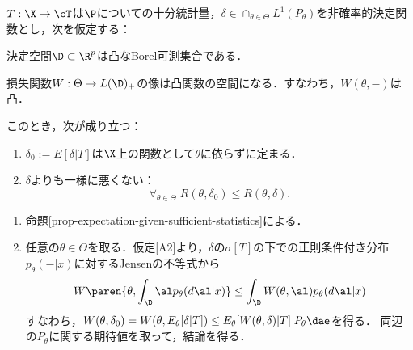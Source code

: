 \documentclass[uplatex,dvipdfmx]{jsreport}
\begin{document}
\begin{theorem}
    $T:\X\to\cT$は$\P$についての十分統計量，$\delta\in\cap_{\theta\in\Theta}L^1(P_\theta)$を非確率的決定関数とし，次を仮定する：
    \begin{enumerate}[{[A}1{]}]
        \item 決定空間$\D\subset\R^p$は凸なBorel可測集合である．
        \item 損失関数$W:\Theta\to L(\D)_+$の像は凸関数の空間になる．すなわち，$W(\theta,-)$は凸．
    \end{enumerate}
    このとき，次が成り立つ：
    \begin{enumerate}
        \item $\delta_0:=E[\delta|T]$は$\X$上の関数として$\theta$に依らずに定まる．
        \item $\delta$よりも一様に悪くない：
        \[\forall_{\theta\in\Theta}\;R(\theta,\delta_0)\le R(\theta,\delta).\]
    \end{enumerate}
\end{theorem}
\begin{Proof}\mbox{}
    \begin{enumerate}
        \item 命題\ref{prop-expectation-given-sufficient-statistics}による．
        \item 任意の$\theta\in\Theta$を取る．仮定[A2]より，$\delta$の$\sigma[T]$の下での正則条件付き分布$p_\theta(-|x)$に対するJensenの不等式から
        \[W\paren{\theta,\int_\D\al p_\theta(d\al|x)}\le\int_\D W(\theta,\al)p_\theta(d\al|x)\]
        すなわち，$W(\theta,\delta_0)=W(\theta,E_\theta[\delta|T])\le E_\theta[W(\theta,\delta)|T]\;P_\theta\dae$を得る．
        両辺の$P_\theta$に関する期待値を取って，結論を得る．
    \end{enumerate}
\end{Proof}
\end{document}
